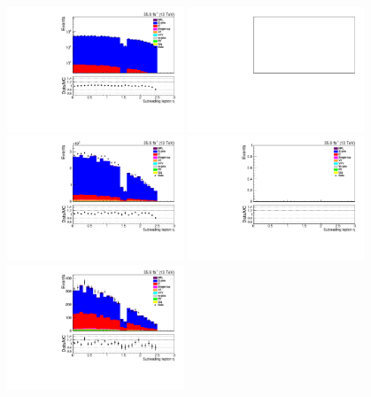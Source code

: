 \begin{figure}[h]
\centering
\includegraphics[width=0.47\textwidth]{figs/background-estimation/plots/unblinded/prompt_ee_ttbarInc/lep2Eta_NPL_ee_lepSel_ee_log.pdf}
\includegraphics[width=0.47\textwidth]{figs/background-estimation/plots/unblinded/prompt_mumu_ttbarInc/lep2Eta_NPL_mumu_lepSel_mumu_log.pdf}
\\
\includegraphics[width=0.47\textwidth]{figs/background-estimation/plots/unblinded/prompt_ee_ttbarInc/lep2Eta_NPL_ee_jetSel_ee.pdf}
\includegraphics[width=0.47\textwidth]{figs/background-estimation/plots/unblinded/prompt_mumu_ttbarInc/lep2Eta_NPL_mumu_jetSel_mumu.pdf}
\\
\includegraphics[width=0.47\textwidth]{figs/background-estimation/plots/unblinded/prompt_ee_ttbarInc/lep2Eta_NPL_ee_wMass_ee.pdf}

\end{figure}
